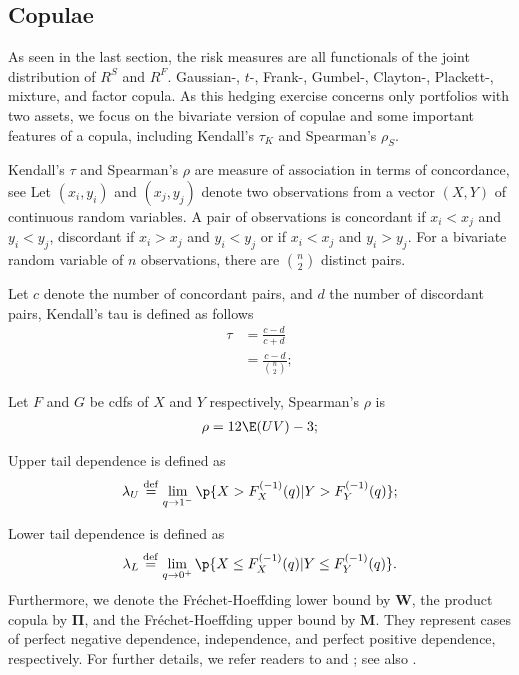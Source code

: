 
\subsection{Copulae}\label{subsec:copulae}
As seen in the last section, the risk measures are all
functionals of the joint distribution of $R^S$ and $R^F$.
 Gaussian-, $t$-, Frank-,
Gumbel-, Clayton-, Plackett-, mixture, and factor copula. 
As this hedging exercise concerns only portfolios with two assets, we
focus on the bivariate version of copulae and some important
features of a copula, including Kendall's $\tau_K$ and Spearman's $\rho_S$. \medskip

Kendall's $\tau$ and Spearman's $\rho$ are measure of association in terms of concordance, see \cite{kruskal1958ordinal}
Let $(x_i, y_i)$ and $(x_j, y_j)$ denote two observations from a vector $(X, Y)$ of continuous random variables.
A pair of observations is concordant if $x_i<x_j$ and $y_i < y_j$, discordant if
$x_i>x_j$ and $y_i < y_j$ or if $x_i<x_j$ and $y_i>y_j$.
For a bivariate random variable of $n$ observations, there are $\binom{n}{2}$ distinct pairs. \medskip

Let $c$ denote the number of concordant pairs, and $d$ the number of discordant pairs,
Kendall's tau is defined as follows \citep{Nelsen1999}
\begin{align*}
\tau &= \frac{c-d}{c+d} \\[10pt]
     &= \frac{c-d}{\binom{n}{2}};
\end{align*}

Let $F$ and $G$ be cdfs of $X$ and $Y$ respectively, Spearman's $\rho$ is
\begin{align*}
\rho = 12\E (UV)-3;
\end{align*}

Upper tail dependence is defined as
\begin{equation*}
\lambda_U \overset{\mathrm{def}}{=}  \lim_{q
  \rightarrow 1^-} \p\{X > F_{X}^{(-1)}(q)|Y > F_{Y}^{(-1)}(q)\};
\end{equation*}

Lower tail dependence is defined as
\begin{equation*}
\lambda_L \overset{\mathrm{def}}{=}  \lim_{q
  \rightarrow 0^+} \p\{X \leq F_{X}^{(-1)}(q)|Y \leq
F_{Y}^{(-1)}(q)\}. 
\end{equation*}
Furthermore, we denote the Fr{\'e}chet-Hoeffding lower bound by
$\bm{W}$, the product copula by $\bm{\Pi}$, and the Fr{\'e}chet-Hoeffding
upper bound by $\bm{M}$. They represent cases of perfect negative
dependence, independence, and perfect positive dependence,
respectively. 
For further details, we refer readers to \citet{joe1997multivariate}
and \citet{Nelsen1999}; see also \citet{hardle2010copulis}.

